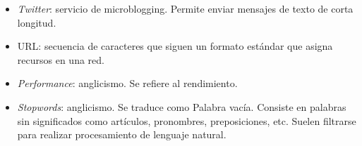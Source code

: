 \begin{glosario}
\begin{itemize}
\item \textit{Twitter}: servicio de microblogging. Permite enviar mensajes de texto de corta longitud.
\item URL: secuencia de caracteres que siguen un formato estándar que asigna recursos en una red.
\item \textit{Performance}: anglicismo. Se refiere al rendimiento.
\item \textit{Stopwords}: anglicismo. Se traduce como Palabra vacía. Consiste en palabras sin significados como artículos, pronombres, preposiciones, etc. Suelen filtrarse para realizar procesamiento de lenguaje natural.
\end{itemize}

\end{glosario}
